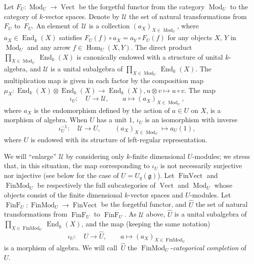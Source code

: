 \documentclass[pdftex]{sigma}%
\numberwithin{equation}{section}
\numberwithin{figure}{section}
\begin{document}
Let $F_U\colon \operatorname{Mod}_{U}\rightarrow \operatorname{Vect}$ be the forgetful functor from the category $\operatorname{Mod}_{U}$ to the category of $k$-vector spaces. Denote by ${\mathcal U}$ the set of natural transformations from~$F_U$ to~$F_U.$ An element of~${\mathcal U}$ is a collection $(a_X)_{X\in \operatorname{Mod}_{U}}$, where $a_X\in \operatorname{End}_k(X)$ satisfies $F_U(f)\circ a_X=a_Y\circ F_U(f)$ for any objects $X$, $Y$ in $\operatorname{Mod}_{U}$ and any arrow $f\in \operatorname{Hom}_U(X,Y)$. The direct product $\prod_{X\in \operatorname{Mod}_{U}} \operatorname{End}_k(X)$ is canonically endowed with a structure of unital $k$-algebra, and ${\mathcal U}$ is a unital subalgebra of $\prod_{X\in \operatorname{Mod}_{U}} \operatorname{End}_k(X)$. The multiplication map is given in each factor by the composition map $\mu_{X}\colon \operatorname{End}_k(X)\otimes \operatorname{End}_k(X)\to \operatorname{End}_k(X), u\otimes v\mapsto u\circ v$. The map
\[\iota_U\colon \quad U\to {\mathcal U}, \qquad a\mapsto (a_X)_{X\in \operatorname{Mod}_{U}},\] where $a_X$ is the endomorphism defined by the action of $a\in U$ on $X$, is a morphism of algebra. When $U$ has a unit $1$, $\iota_U$ is an isomorphism with inverse
\[
\iota_U^{-1}\colon \quad {\mathcal U}\to U,\qquad (a_X)_{X\in \operatorname{Mod}_{U}}\mapsto a_{U}(1),
\]
 where $U$ is endowed with its structure of left-regular representation.

We will ``enlarge'' ${\mathcal U}$ by considering only $k$-finite dimensional $U$-modules; we stress that, in this situation, the map corresponding to $\iota_U$ is not necessarily surjective nor injective (see below for the case of $U=U_q({\mathfrak g})$). Let $\operatorname{FinVect}$ and $\operatorname{FinMod}_{U}$ be respectively the full subcategories of $\operatorname{Vect}$ and $\operatorname{Mod}_{U}$ whose objects consist of the finite dimensional $k$-vector spaces and $U$-modules. Let $\operatorname{FinF}_{U}\colon \operatorname{FinMod}_{U}\to \operatorname{FinVect}$ be the forgetful functor, and $\hat{ U}$ the set of natural transformations from $\operatorname{FinF}_{U}$ to $\operatorname{FinF}_{U}$. As $\mathcal{U}$ above, $\hat{ U}$ is a unital subalgebra of $\textstyle \prod_{X\in \operatorname{FinMod}_{U}} \operatorname{End}_k(X)$, and the map (keeping the same notation)
\[\iota_U\colon \quad U\to \hat{ U}, \qquad a\mapsto (a_X)_{X\in \operatorname{FinMod}_{U}}\]
is a morphism of algebra. We will call~$\hat{U}$ the $\operatorname{FinMod}_{U} $-{\it categorical completion} of~$U$.
\end{document}
